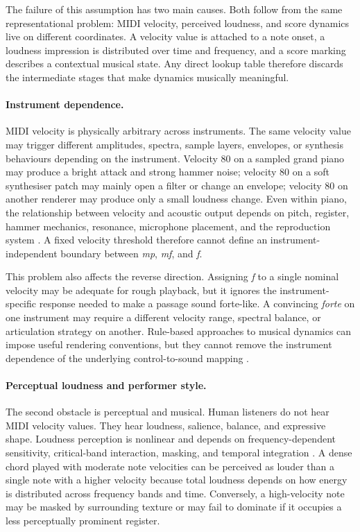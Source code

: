 The failure of this assumption has two main causes. Both follow from the same representational problem: MIDI velocity, perceived loudness, and score dynamics live on different coordinates. A velocity value is attached to a note onset, a loudness impression is distributed over time and frequency, and a score marking describes a contextual musical state. Any direct lookup table therefore discards the intermediate stages that make dynamics musically meaningful.

\paragraph{Instrument dependence.}
MIDI velocity is physically arbitrary across instruments. The same velocity value may trigger different amplitudes, spectra, sample layers, envelopes, or synthesis behaviours depending on the instrument. Velocity 80 on a sampled grand piano may produce a bright attack and strong hammer noise; velocity 80 on a soft synthesiser patch may mainly open a filter or change an envelope; velocity 80 on another renderer may produce only a small loudness change. Even within piano, the relationship between velocity and acoustic output depends on pitch, register, hammer mechanics, resonance, microphone placement, and the reproduction system \cite{goebl2003role,dan2006psy}. A fixed velocity threshold therefore cannot define an instrument-independent boundary between \textit{mp}, \textit{mf}, and \textit{f}.

This problem also affects the reverse direction. Assigning \textit{f} to a single nominal velocity may be adequate for rough playback, but it ignores the instrument-specific response needed to make a passage sound forte-like. A convincing \textit{forte} on one instrument may require a different velocity range, spectral balance, or articulation strategy on another. Rule-based approaches to musical dynamics can impose useful rendering conventions, but they cannot remove the instrument dependence of the underlying control-to-sound mapping \cite{berndt2010modelling}.

\paragraph{Perceptual loudness and performer style.}
The second obstacle is perceptual and musical. Human listeners do not hear MIDI velocity values. They hear loudness, salience, balance, and expressive shape. Loudness perception is nonlinear and depends on frequency-dependent sensitivity, critical-band interaction, masking, and temporal integration \cite{zwicker1999psychoacoustics,zwicker2007psychoacoustics}. A dense chord played with moderate note velocities can be perceived as louder than a single note with a higher velocity because total loudness depends on how energy is distributed across frequency bands and time. Conversely, a high-velocity note may be masked by surrounding texture or may fail to dominate if it occupies a less perceptually prominent register.


